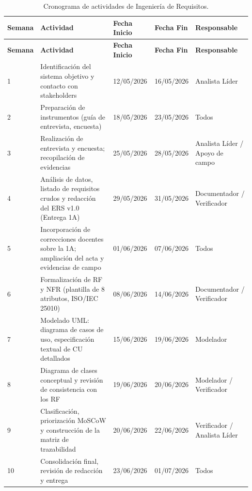 \documentclass[11pt,a4paper]{article}
\begin{document}
\begin{longtable}{|p{1.2cm}|p{4.2cm}|p{2.6cm}|p{2.6cm}|p{3.6cm}|}
\caption{Cronograma de actividades de Ingeniería de Requisitos.}
\label{tab:cronograma-ir} \\
\hline
\textbf{Semana} & \textbf{Actividad} & \textbf{Fecha Inicio} & \textbf{Fecha Fin} & \textbf{Responsable} \\
\hline
\endfirsthead

\hline
\textbf{Semana} & \textbf{Actividad} & \textbf{Fecha Inicio} & \textbf{Fecha Fin} & \textbf{Responsable} \\
\hline
\endhead

\hline
\endfoot

\hline
\endlastfoot

1 & Identificación del sistema objetivo y contacto con stakeholders & 12/05/2026 & 16/05/2026 & Analista Líder \\
\hline

2 & Preparación de instrumentos (guía de entrevista, encuesta) & 18/05/2026 & 23/05/2026 & Todos \\
\hline

3 & Realización de entrevista y encuesta; recopilación de evidencias & 25/05/2026 & 28/05/2026 & Analista Líder / Apoyo de campo \\
\hline

4 & Análisis de datos, listado de requisitos crudos y redacción del ERS v1.0 (Entrega 1A) & 29/05/2026 & 31/05/2026 & Documentador / Verificador \\
\hline

5 & Incorporación de correcciones docentes sobre la 1A; ampliación del acta y evidencias de campo & 01/06/2026 & 07/06/2026 & Todos \\
\hline

6 & Formalización de RF y NFR (plantilla de 8 atributos, ISO/IEC 25010) & 08/06/2026 & 14/06/2026 & Documentador / Verificador \\
\hline

7 & Modelado UML: diagrama de casos de uso, especificación textual de CU detallados & 15/06/2026 & 19/06/2026 & Modelador \\
\hline

8 & Diagrama de clases conceptual y revisión de consistencia con los RF & 19/06/2026 & 20/06/2026 & Modelador / Verificador \\
\hline

9 & Clasificación, priorización MoSCoW y construcción de la matriz de trazabilidad & 20/06/2026 & 22/06/2026 & Verificador / Analista Líder \\
\hline

10 & Consolidación final, revisión de redacción y entrega & 23/06/2026 & 01/07/2026 & Todos \\
\hline

\end{longtable}
\end{document}
